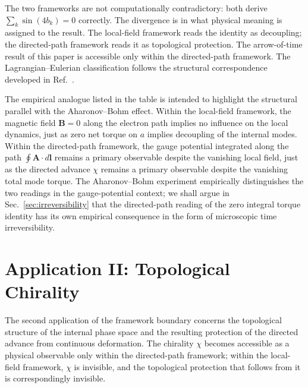 \documentclass[%
 reprint, amsmath,amssymb, aps, prb, ]{revtex4-2}
\numberwithin{equation}{section}
\begin{document}
\begin{table}[t!]
\begin{tabular}{p{3.5cm}p{5.5cm}p{6.5cm}}
\end{tabular}
\vspace{0.2cm}
\begin{minipage}{0.95\textwidth}
\justifying\footnotesize
The two frameworks are not computationally contradictory: both derive $\sum_k\sin(4b_k)=0$ correctly. The divergence is in what physical meaning is assigned to the result. The local-field framework reads the identity as decoupling; the directed-path framework reads it as topological protection. The arrow-of-time result of this paper is accessible only within the directed-path framework. The Lagrangian--Eulerian classification follows the structural correspondence developed in Ref.~\cite{hanamura55}.
\end{minipage}
\end{table}

The empirical analogue listed in the table is intended to highlight the structural parallel with the Aharonov--Bohm effect. Within the local-field framework, the magnetic field $\mathbf{B}=0$ along the electron path implies no influence on the local dynamics, just as zero net torque on $a$ implies decoupling of the internal modes. Within the directed-path framework, the gauge potential integrated along the path $\oint\mathbf{A}\cdot d\mathbf{l}$ remains a primary observable despite the vanishing local field, just as the directed advance $\chi$ remains a primary observable despite the vanishing total mode torque. The Aharonov--Bohm experiment empirically distinguishes the two readings in the gauge-potential context; we shall argue in Sec.~\ref{sec:irreversibility} that the directed-path reading of the zero integral torque identity has its own empirical consequence in the form of microscopic time irreversibility.


\section{Application II: Topological Chirality}
\label{sec:chirality}

The second application of the framework boundary concerns the topological structure of the internal phase space and the resulting protection of the directed advance from continuous deformation. The chirality $\chi$ becomes accessible as a physical observable only within the directed-path framework; within the local-field framework, $\chi$ is invisible, and the topological protection that follows from it is correspondingly invisible.
\end{document}

